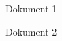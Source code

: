 \documentclass[german]{tfbrief}
\begin{document}
\begin{letter}

%
%
\lipsum

\end{letter}

%
%

\begin{attachment}
\item Dokument 1
\item Dokument 2
\end{attachment}
\end{document}
